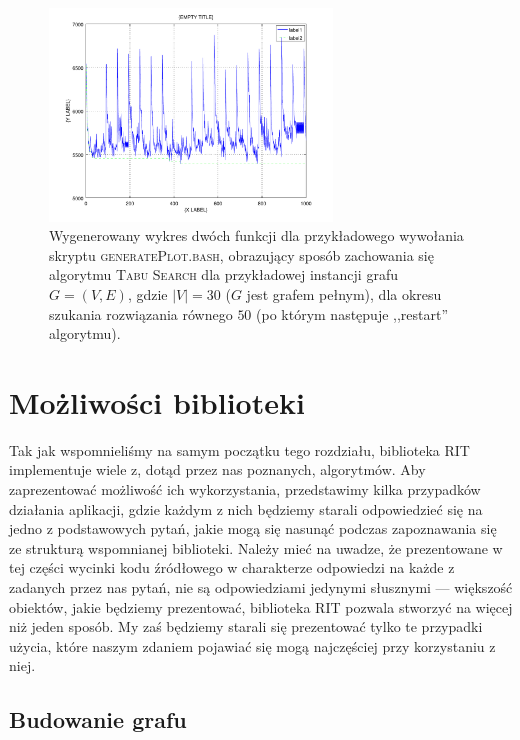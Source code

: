\begin{figure}[!htbp]
	\null\hfill
	\includegraphics[width=0.67\textwidth]{Appendix_I/GENERATE-PLOT-example/1}
	\hfill\null
	\caption{
		Wygenerowany wykres dwóch funkcji dla przykładowego wywołania skryptu \textsc{generatePlot.bash}, obrazujący sposób zachowania się algorytmu \textsc{Tabu Search} dla przykładowej instancji grafu $G = \left( V, E \right)$, gdzie $\left| V \right| = 30$ ($G$ jest grafem pełnym), dla okresu szukania rozwiązania równego $50$ (po którym następuje ,,restart'' algorytmu).
	}
	\label{fig:genplot}
\end{figure}

\section{Możliwości biblioteki}

Tak jak wspomnieliśmy na samym początku tego rozdziału, biblioteka \textsc{RIT} implementuje wiele z, dotąd przez nas poznanych, algorytmów. Aby zaprezentować możliwość ich wykorzystania, przedstawimy kilka przypadków działania aplikacji, gdzie każdym z nich będziemy starali odpowiedzieć się na jedno z podstawowych pytań, jakie mogą się nasunąć podczas zapoznawania się ze strukturą wspomnianej biblioteki. Należy mieć na uwadze, że prezentowane w tej części wycinki kodu źródłowego w charakterze odpowiedzi na każde z zadanych przez nas pytań, nie są odpowiedziami jedynymi słusznymi --- większość obiektów, jakie będziemy prezentować, biblioteka \textsc{RIT} pozwala stworzyć na więcej niż jeden sposób. My zaś będziemy starali się prezentować tylko te przypadki użycia, które naszym zdaniem pojawiać się mogą najczęściej przy korzystaniu z niej.

\subsection{Budowanie grafu}

